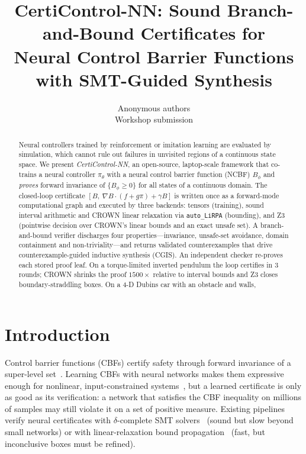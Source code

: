 \documentclass[10pt]{article}
\title{\textbf{CertiControl-NN: Sound Branch-and-Bound Certificates for\\Neural Control Barrier Functions with SMT-Guided Synthesis}}
\author{Anonymous authors\\{\small Workshop submission}}
\date{}
\begin{document}
\maketitle
\vspace{-2em}
\begin{abstract}
\noindent
Neural controllers trained by reinforcement or imitation learning are evaluated by simulation, which cannot rule out failures in unvisited regions of a continuous state space. We present \emph{CertiControl-NN}, an open-source, laptop-scale framework that co-trains a neural controller $\pi_\theta$ with a neural control barrier function (NCBF) $B_\phi$ and \emph{proves} forward invariance of $\{B_\phi\ge 0\}$ for all states of a continuous domain. The closed-loop certificate $[B,\ \nabla B\cdot(f+g\pi)+\gamma B]$ is written once as a forward-mode computational graph and executed by three backends: tensors (training), sound interval arithmetic and CROWN linear relaxation via \texttt{auto\_LiRPA} (bounding), and Z3 (pointwise decision over CROWN's linear bounds and an exact unsafe set). A branch-and-bound verifier discharges four properties---invariance, unsafe-set avoidance, domain containment and non-triviality---and returns validated counterexamples that drive counterexample-guided inductive synthesis (CGIS). An independent checker re-proves each stored proof leaf. On a torque-limited inverted pendulum the loop certifies in 3 rounds; CROWN shrinks the proof $1500\times$ relative to interval bounds and Z3 closes boundary-straddling boxes. On a 4-D Dubins car with an obstacle and walls, \DubAbstract
\end{abstract}

\section{Introduction}
Control barrier functions (CBFs) certify safety through forward invariance of a super-level set~\cite{ames2019cbf,prajna2004barrier}. Learning CBFs with neural networks makes them expressive enough for nonlinear, input-constrained systems~\cite{dawson2023survey,zhao2020synthesizing}, but a learned certificate is only as good as its verification: a network that satisfies the CBF inequality on millions of samples may still violate it on a set of positive measure. Existing pipelines verify neural certificates with $\delta$-complete SMT solvers~\cite{chang2019neural,abate2021fossil} (sound but slow beyond small networks) or with linear-relaxation bound propagation~\cite{wang2023simultaneous} (fast, but inconclusive boxes must be refined).
\end{document}
